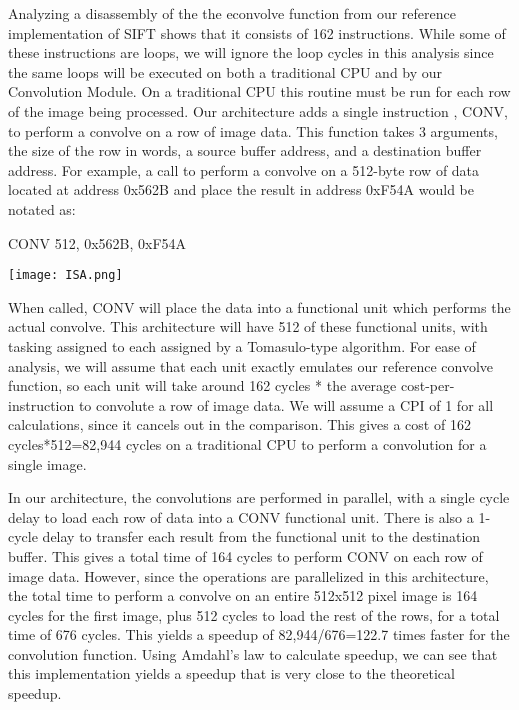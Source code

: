 Analyzing a disassembly of the the econvolve function from our reference implementation of SIFT shows that it consists of 162 instructions. While some of these instructions are loops, we will ignore the loop cycles in this analysis since the same loops will be executed on both a traditional CPU and by our Convolution Module. On a traditional CPU this routine must be run for each row of the image being processed. Our architecture adds a single instruction , CONV, to perform a convolve on a row of image data. This function takes 3 arguments, the size of the row in words, a source buffer address, and a destination buffer address. For example, a call to perform a convolve on a 512-byte row of data located at address 0x562B and place the result in address 0xF54A would be notated as:

CONV 512, 0x562B, 0xF54A

\begin{center}
\texttt{[image: ISA.png]}%
\label{fig:ISA}%
\end{center}

When called, CONV will place the data into a functional unit which performs the actual convolve. This architecture will have 512 of these functional units, with tasking assigned to each assigned by a Tomasulo-type algorithm. For ease of analysis, we will assume that each unit exactly emulates our reference convolve function, so each unit will take around 162 cycles * the average cost-per-instruction to convolute a row of image data. We will assume a CPI of 1 for all calculations, since it cancels out in the comparison. This gives a cost of 162 cycles*512=82,944 cycles on a traditional CPU to perform a convolution for a single image.

In our architecture, the convolutions are performed in parallel, with a single cycle delay to load each row of data into a CONV functional unit. There is also a 1-cycle delay to transfer each result from the functional unit to the destination buffer. This gives a total time of 164 cycles to perform CONV on each row of image data. However, since the operations are parallelized in this architecture, the total time to perform a convolve on an entire 512x512 pixel image is 164 cycles for the first image, plus 512 cycles to load the rest of the rows, for a total time of 676 cycles. This yields a speedup of 82,944/676=122.7 times faster for the convolution function. Using Amdahl's law to calculate speedup, we can see that this implementation yields a speedup that is very close to the theoretical speedup.

